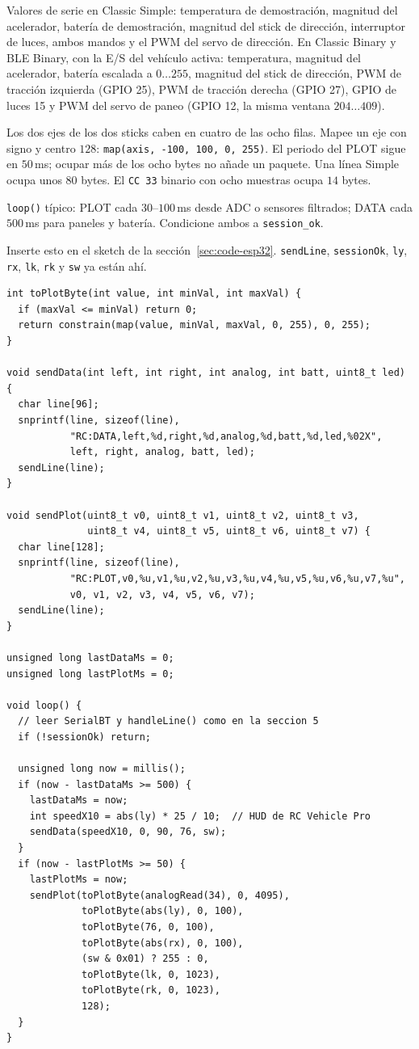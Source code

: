 \documentclass[12pt,a4paper]{article}
\begin{document}
Valores de serie en Classic Simple: temperatura de demostración, magnitud
del acelerador, batería de demostración, magnitud del stick de dirección,
interruptor de luces, ambos mandos y el PWM del servo de dirección.
En Classic Binary y BLE Binary, con la E/S del vehículo activa: temperatura,
magnitud del acelerador, batería escalada a $0\ldots 255$, magnitud del
stick de dirección, PWM de tracción izquierda (GPIO 25), PWM de tracción
derecha (GPIO 27), GPIO de luces 15 y PWM del servo de paneo (GPIO 12, la
misma ventana $204\ldots 409$).

Los dos ejes de los dos sticks caben en cuatro de las ocho filas. Mapee un
eje con signo y centro $128$: \texttt{map(axis, -100, 100, 0, 255)}. El
periodo del PLOT sigue en $50$\,ms; ocupar más de los ocho bytes no añade
un paquete. Una línea Simple ocupa unos $80$ bytes. El \texttt{CC 33}
binario con ocho muestras ocupa $14$ bytes.

\texttt{loop()} típico: PLOT cada $30$--$100$\,ms desde ADC o sensores
filtrados; DATA cada $500$\,ms para paneles y batería. Condicione ambos a
\texttt{session\_ok}.

Inserte esto en el sketch de la sección~\ref{sec:code-esp32}.
\texttt{sendLine}, \texttt{sessionOk}, \texttt{ly}, \texttt{rx}, \texttt{lk},
\texttt{rk} y \texttt{sw} ya están ahí.

\begin{lstlisting}
int toPlotByte(int value, int minVal, int maxVal) {
  if (maxVal <= minVal) return 0;
  return constrain(map(value, minVal, maxVal, 0, 255), 0, 255);
}

void sendData(int left, int right, int analog, int batt, uint8_t led) {
  char line[96];
  snprintf(line, sizeof(line),
           "RC:DATA,left,%d,right,%d,analog,%d,batt,%d,led,%02X",
           left, right, analog, batt, led);
  sendLine(line);
}

void sendPlot(uint8_t v0, uint8_t v1, uint8_t v2, uint8_t v3,
              uint8_t v4, uint8_t v5, uint8_t v6, uint8_t v7) {
  char line[128];
  snprintf(line, sizeof(line),
           "RC:PLOT,v0,%u,v1,%u,v2,%u,v3,%u,v4,%u,v5,%u,v6,%u,v7,%u",
           v0, v1, v2, v3, v4, v5, v6, v7);
  sendLine(line);
}

unsigned long lastDataMs = 0;
unsigned long lastPlotMs = 0;

void loop() {
  // leer SerialBT y handleLine() como en la seccion 5
  if (!sessionOk) return;

  unsigned long now = millis();
  if (now - lastDataMs >= 500) {
    lastDataMs = now;
    int speedX10 = abs(ly) * 25 / 10;  // HUD de RC Vehicle Pro
    sendData(speedX10, 0, 90, 76, sw);
  }
  if (now - lastPlotMs >= 50) {
    lastPlotMs = now;
    sendPlot(toPlotByte(analogRead(34), 0, 4095),
             toPlotByte(abs(ly), 0, 100),
             toPlotByte(76, 0, 100),
             toPlotByte(abs(rx), 0, 100),
             (sw & 0x01) ? 255 : 0,
             toPlotByte(lk, 0, 1023),
             toPlotByte(rk, 0, 1023),
             128);
  }
}
\end{lstlisting}
\end{document}
